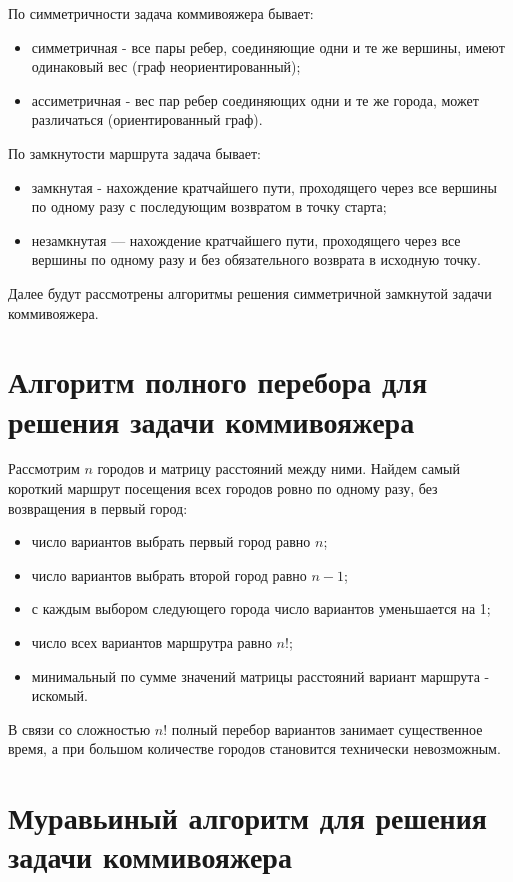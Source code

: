 По симметричности задача коммивояжера бывает:
\begin{itemize}
	\item симметричная - все пары ребер, соединяющие одни и те же вершины, имеют одинаковый вес (граф неориентированный);
	\item ассиметричная - вес пар ребер соединяющих одни и те же города, может различаться (ориентированный граф).
\end{itemize}

По замкнутости маршрута задача бывает: 
\begin{itemize}
	\item замкнутая - нахождение кратчайшего пути, проходящего через все вершины по одному разу с последующим возвратом в точку старта;
	\item незамкнутая — нахождение кратчайшего пути, проходящего через все вершины по одному разу и без обязательного возврата в исходную точку.
\end{itemize}

Далее будут рассмотрены алгоритмы решения симметричной замкнутой задачи коммивояжера.

\section{Алгоритм полного перебора для решения задачи коммивояжера}

Рассмотрим $n$ городов и матрицу расстояний между ними. Найдем самый короткий маршрут посещения всех городов ровно по одному разу, без возвращения в первый город:

\begin{itemize}
	\item число вариантов выбрать первый город равно $n$;
	\item число вариантов выбрать второй город равно $n - 1$;
	\item с каждым выбором следующего города число вариантов уменьшается на 1;
	\item число всех вариантов маршрутра равно $n!$;
	\item минимальный по сумме значений матрицы расстояний вариант маршрута - искомый.
\end{itemize}

В связи со сложностью $n!$ полный перебор вариантов занимает существенное время, а при большом количестве городов становится технически невозможным.

\section{Муравьиный алгоритм для решения задачи коммивояжера}

